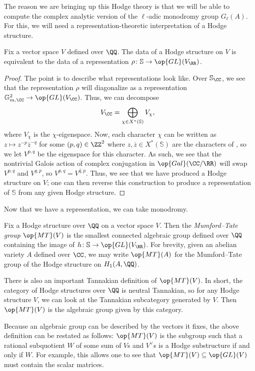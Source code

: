 \documentclass{article}
\begin{document}
The reason we are bringing up this Hodge theory is that we will be able to compute the complex analytic version of the $\ell$-adic monodromy group $G_\ell(A)$. For this, we will need a representation-theoretic interpretation of a Hodge structure.
\begin{lemma}
	Fix a vector space $V$ defined over $\QQ$. The data of a Hodge structure on $V$ is equivalent to the data of a representation $\rho\colon\mathbb S\to\op{GL}(V_\RR)$.
\end{lemma}
\begin{proof}
	The point is to describe what representations look like. Over $\mathbb S_\CC$, we see that the representation $\rho$ will diagonalize as a representation $\mathbb G_{m,\CC}^2\to\op{GL}(V_\CC)$. Thus, we can decompose
	\[V_\CC=\bigoplus_{\chi\in X^*(\mathbb S)}V_\chi,\]
	where $V_\chi$ is the $\chi$-eigenspace. Now, each character $\chi$ can be written as $z\mapsto z^{-p}\overline z^{-q}$ for some $(p,q)\in\ZZ^2$ where $z,\overline z\in X^*(\mathbb S)$ are the characters of , so we let $V^{p,q}$ be the eigenspace for this character. As such, we see that the nontrivial Galois action of complex conjugation in $\op{Gal}(\CC/\RR)$ will swap $V^{p,q}$ and $V^{q,p}$, so $V^{p,q}=\overline{V^{q,p}}$. Thus, we see that we have produced a Hodge structure on $V$; one can then reverse this construction to produce a representation of $\mathbb S$ from any given Hodge structure.
\end{proof}
Now that we have a representation, we can take monodromy.
\begin{definition}
	Fix a Hodge structure over $\QQ$ on a vector space $V$. Then the \textit{Mumford--Tate group} $\op{MT}(V)$ is the smallest connected algebraic group defined over $\QQ$ containing the image of $h\colon\mathbb S\to\op{GL}(V_\RR)$. For brevity, given an abelian variety $A$ defined over $\CC$, we may write $\op{MT}(A)$ for the Mumford--Tate group of the Hodge structure on $H_1(A,\QQ)$.
\end{definition}
\begin{remark}
	There is also an important Tannakian definition of $\op{MT}(V)$. In short, the category of Hodge structures over $\QQ$ is neutral Tannakian, so for any Hodge structure $V$, we can look at the Tannakian subcategory generated by $V$. Then $\op{MT}(V)$ is the algebraic group given by this category.
\end{remark}
\begin{remark}
	Because an algebraic group can be described by the vectors it fixes, the above definition can be restated as follows: $\op{MT}(V)$ is the subgroup such that a rational subquotient $W$ of some sum of $V$s and $V^\lor$s is a Hodge substructure if and only if $W$. For example, this allows one to see that $\op{MT}(V)\subseteq\op{GL}(V)$ must contain the scalar matrices.
\end{remark}
\end{document}
